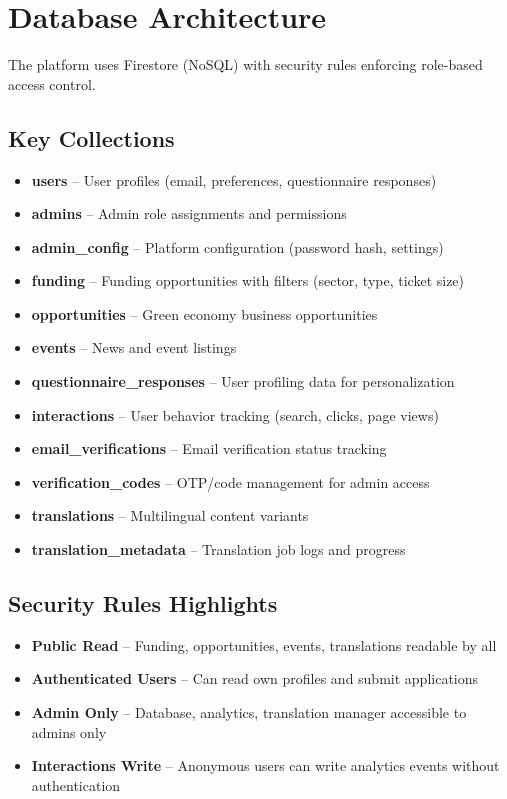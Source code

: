 \documentclass[a4paper,12pt]{article}
\begin{document}
\section{Database Architecture}
The platform uses Firestore (NoSQL) with security rules enforcing role-based access control.

\subsection{Key Collections}
\begin{itemize}
    \item \textbf{users} – User profiles (email, preferences, questionnaire responses)
    \item \textbf{admins} – Admin role assignments and permissions
    \item \textbf{admin\_config} – Platform configuration (password hash, settings)
    \item \textbf{funding} – Funding opportunities with filters (sector, type, ticket size)
    \item \textbf{opportunities} – Green economy business opportunities
    \item \textbf{events} – News and event listings
    \item \textbf{questionnaire\_responses} – User profiling data for personalization
    \item \textbf{interactions} – User behavior tracking (search, clicks, page views)
    \item \textbf{email\_verifications} – Email verification status tracking
    \item \textbf{verification\_codes} – OTP/code management for admin access
    \item \textbf{translations} – Multilingual content variants
    \item \textbf{translation\_metadata} – Translation job logs and progress
\end{itemize}

\subsection{Security Rules Highlights}
\begin{itemize}
    \item \textbf{Public Read} – Funding, opportunities, events, translations readable by all
    \item \textbf{Authenticated Users} – Can read own profiles and submit applications
    \item \textbf{Admin Only} – Database, analytics, translation manager accessible to admins only
    \item \textbf{Interactions Write} – Anonymous users can write analytics events without authentication
\end{itemize}
\end{document}
